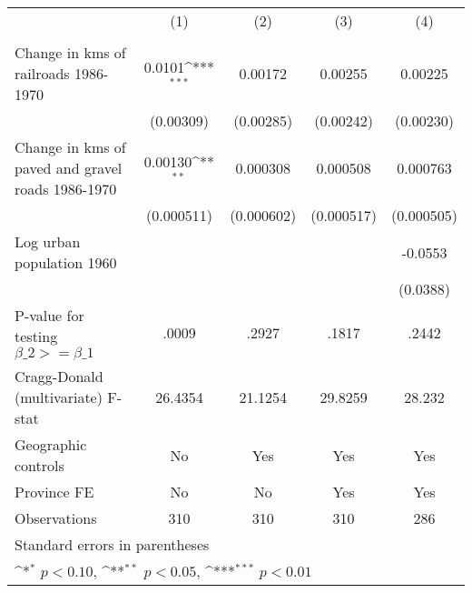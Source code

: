 {
\def\sym#1{\ifmmode^{#1}\else\(^{#1}\)\fi}
\begin{tabular}{l*{4}{c}}
\hline\hline
                &\multicolumn{1}{c}{(1)}&\multicolumn{1}{c}{(2)}&\multicolumn{1}{c}{(3)}&\multicolumn{1}{c}{(4)}\\
                &\multicolumn{1}{c}{}&\multicolumn{1}{c}{}&\multicolumn{1}{c}{}&\multicolumn{1}{c}{}\\
\hline
Change in kms of railroads 1986-1970&   0.0101\sym{***}&  0.00172         &  0.00255         &  0.00225         \\
                &(0.00309)         &(0.00285)         &(0.00242)         &(0.00230)         \\
[1em]
Change in kms of paved and gravel roads 1986-1970&  0.00130\sym{**} & 0.000308         & 0.000508         & 0.000763         \\
                &(0.000511)         &(0.000602)         &(0.000517)         &(0.000505)         \\
[1em]
Log urban population 1960&                  &                  &                  &  -0.0553         \\
                &                  &                  &                  & (0.0388)         \\
\hline
P-value for testing $\beta\_{2} >= \beta\_{1}$&    .0009         &    .2927         &    .1817         &    .2442         \\
Cragg-Donald (multivariate) F-stat&  26.4354         &  21.1254         &  29.8259         &   28.232         \\
Geographic controls&       No         &      Yes         &      Yes         &      Yes         \\
Province FE     &       No         &       No         &      Yes         &      Yes         \\
Observations    &      310         &      310         &      310         &      286         \\
\hline\hline
\multicolumn{5}{l}{\footnotesize Standard errors in parentheses}\\
\multicolumn{5}{l}{\footnotesize \sym{*} \(p<0.10\), \sym{**} \(p<0.05\), \sym{***} \(p<0.01\)}\\
\end{tabular}
}
